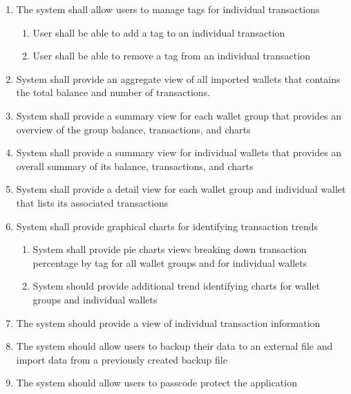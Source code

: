 \begin{adjustwidth}{1.5em}{0pt}
\begin{enumerate}
		\item The system shall allow users to manage tags for individual transactions
		\begin{enumerate}
			\item User shall be able to add a tag to an individual transaction
			\item User shall be able to remove a tag from an individual transaction
		\end{enumerate}

		\item System shall provide an aggregate view of all imported wallets that contains the total balance and number of transactions.
		
		\item System shall provide a summary view for each wallet group that provides an overview of the group balance, transactions, and charts
		
		\item System shall provide a summary view for individual wallets that provides an overall summary of its balance, transactions, and charts
		
		\item System shall provide a detail view for each wallet group and individual wallet that lists its associated transactions
		
		\item System shall provide graphical charts for identifying transaction trends
		\begin{enumerate}
			\item System shall provide pie charts views breaking down transaction percentage by tag for all wallet groups and for individual wallets
			\item System should provide additional trend identifying charts for wallet groups and individual wallets
		\end{enumerate}
		
		\item The system should provide a view of individual transaction information
		
		\item The system should allow users to backup their data to an external file and import data from a previously created backup file
		
		\item The system should allow users to passcode protect the application
		
	\end{enumerate}

\end{adjustwidth}
